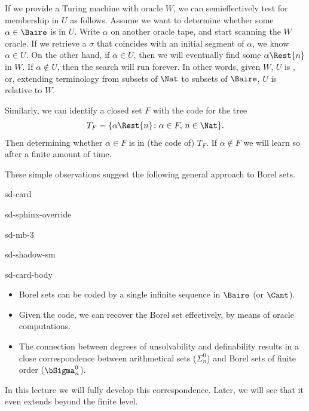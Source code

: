 \documentclass[letterpaper,10pt,english]{jupyterBook}
\begin{document}
\sphinxAtStartPar
If we provide a Turing machine with oracle \(W\), we can semi\sphinxhyphen{}effectively test for membership in \(U\) as follows. Assume we want to determine whether some \(\alpha \in \Baire\) is in \(U\). Write \(\alpha\) on another oracle tape, and start scanning the \(W\) oracle. If we retrieve a \(\sigma\) that coincides with an initial segment of \(\alpha\), we know \(\alpha \in U\). On the other hand, if \(\alpha \in U\), then we will eventually find some \(\alpha\Rest{n}\) in \(W\). If \(\alpha \not\in U\), then the search will run forever. In other words, given \(W\), \(U\) is , or, extending terminology from subsets of \(\Nat\) to subsets of \(\Baire\), \(U\) is
 relative to \(W\).

\sphinxAtStartPar
Similarly, we can identify a closed set \(F\) with the code for the tree
\begin{equation*}
\begin{split} 
T_F = \{\alpha\Rest{n} \colon \alpha\in F,\, n\in \Nat \}.
\end{split}
\end{equation*}
\sphinxAtStartPar
Then determining whether \(\alpha \in F\) is  in (the code of) \(T_F\). If \(\alpha \not\in F\) we will learn so after a finite amount of time.

\sphinxAtStartPar
These simple observations suggest the following general approach to Borel sets.

\begin{sphinxuseclass}{sd-card}
\begin{sphinxuseclass}{sd-sphinx-override}
\begin{sphinxuseclass}{sd-mb-3}
\begin{sphinxuseclass}{sd-shadow-sm}
\begin{sphinxuseclass}{sd-card-body}\begin{itemize}
\item {} 
\sphinxAtStartPar
Borel sets can be coded by a single infinite sequence in \(\Baire\) (or \(\Cant\)).

\item {} 
\sphinxAtStartPar
Given the code, we can recover the Borel set effectively, by means of oracle computations.

\item {} 
\sphinxAtStartPar
The connection between degrees of unsolvability and definability results in a close correspondence between arithmetical sets (\(\Sigma^0_n\)) and Borel sets of finite order (\(\bSigma^0_n\)).

\end{itemize}

\end{sphinxuseclass}
\end{sphinxuseclass}
\end{sphinxuseclass}
\end{sphinxuseclass}
\end{sphinxuseclass}
\sphinxAtStartPar
In this lecture we will fully develop this correspondence. Later, we will see that it even extends beyond the finite level.
\end{document}
